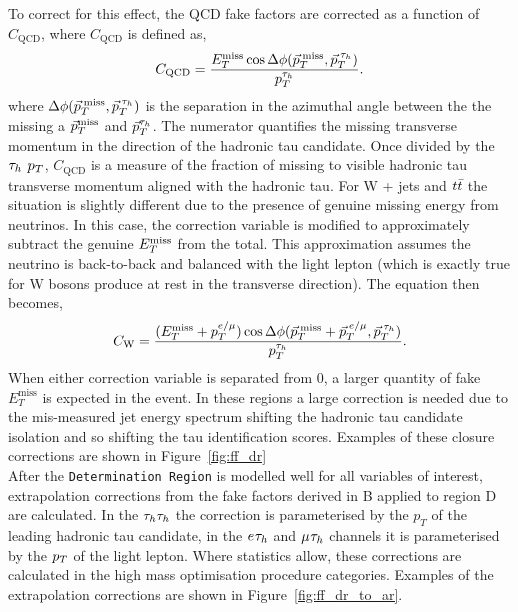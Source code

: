 To correct for this effect, the QCD fake factors are corrected as a function of $C_{\text{QCD}}$, where $C_{\text{QCD}}$ is defined as,
\begin{equation}
C_{\text{QCD}} = \frac{E_{T}^{\text{miss}} \cos\Delta\phi(\vec{p}_{T}^{\text{\hspace{2pt}miss}},\vec{p}_{T}^{\hspace{2pt}\tau_{h}})}{p_{T}^{\tau_{h}}}.
\label{eqn:c_qcd}
\end{equation}
where $\Delta\phi(\vec{p}_{T}^{\hspace{2pt}\text{miss}},\vec{p}_{T}^{\hspace{2pt}\tau_{h}})$ is the separation in the azimuthal angle between the the missing a $\vec{p}_{T}^{\text{miss}}$ and $\vec{p}_{T}^{\tau_{h}}$.
The numerator quantifies the missing transverse momentum in the direction of the hadronic tau candidate. 
Once divided by the $\tau_{h}$ $p_{T}$, $C_{\text{QCD}}$ is a measure of the fraction of missing to visible hadronic tau transverse momentum aligned with the hadronic tau.
For W + jets and $t\bar{t}$ the situation is slightly different due to the presence of genuine missing energy from neutrinos.
In this case, the correction variable is modified to approximately subtract the genuine $E_{T}^{\text{miss}}$ from the total.
This approximation assumes the neutrino is back-to-back and balanced with the light lepton (which is exactly true for W bosons produce at rest in the transverse direction). 
The equation then becomes,
\begin{equation}
C_{\text{W}} = \frac{(E_{T}^{\text{miss}}+p_{T}^{e/\mu}) \cos\Delta\phi(\vec{p}_{T}^{\text{\hspace{2pt}miss}}+\vec{p}_{T}^{\hspace{2pt}e/\mu},\vec{p}_{T}^{\hspace{2pt}\tau_{h}})}{p_{T}^{\tau_{h}}}.
\label{eqn:c_w}
\end{equation}
When either correction variable is separated from 0, a larger quantity of fake $E_{T}^{\text{miss}}$ is expected in the event. 
In these regions a large correction is needed due to the mis-measured jet energy spectrum shifting the hadronic tau candidate isolation and so shifting the tau identification scores. 
Examples of these closure corrections are shown in Figure~\ref{fig:ff_dr}\\

After the \texttt{Determination Region} is modelled well for all variables of interest, extrapolation corrections from the fake factors derived in B applied to region D are calculated.
In the $\tau_{h}\tau_{h}$ the correction is parameterised by the $p_{T}$ of the leading hadronic tau candidate, in the $e_{}\tau_{h}$ and $\mu_{}\tau_{h}$ channels it is parameterised by the $p_{T}$ of the light lepton.
Where statistics allow, these corrections are calculated in the high mass optimisation procedure categories.
Examples of the extrapolation corrections are shown in Figure~\ref{fig:ff_dr_to_ar}.

